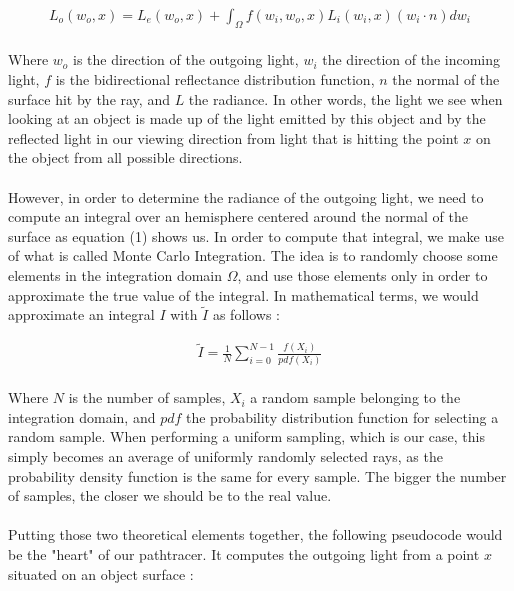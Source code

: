 \documentclass[12pt, oneside]{report}
\begin{document}
\begin{align}
	L_{o}(w_{o}, x) = L_{e}(w_{o}, x) + \int_{\Omega} f(w_{i}, w_{o}, x) L_{i}(w_{i}, x)(w_{i} \cdot n) dw_{i}
\end{align}

\paragraph{}Where $w_{o}$ is the direction of the outgoing light, $w_{i}$ the direction of the incoming light, $f$ is the bidirectional reflectance distribution function, $n$ the normal of the surface hit by the ray, and $L$ the radiance. In other words, the light we see when looking at an object is made up of the light emitted by this object and by the reflected light in our viewing direction from light that is hitting the point $x$ on the object from all possible directions.

\paragraph{}However, in order to determine the radiance of the outgoing light, we need to compute an integral over an hemisphere centered around the normal of the surface as equation (1) shows us. In order to compute that integral, we make use of what is called Monte Carlo Integration. The idea is to randomly choose some elements in the integration domain $\Omega$, and use those elements only in order to approximate the true value of the integral. In mathematical terms, we would approximate an integral $I$ with $\widetilde{I}$ as follows \cite{scratchapixel} :

\begin{align}
	\widetilde{I} = \frac{1}{N} \sum_{i=0}^{N-1} \frac{f(X_{i})}{pdf(X_{i})}
\end{align}

\paragraph{}Where $N$ is the number of samples, $X_{i}$ a random sample belonging to the integration domain, and $pdf$ the probability distribution function for selecting a random sample. When performing a uniform sampling, which is our case, this simply becomes an average of uniformly randomly selected rays, as the probability density function is the same for every sample. The bigger the number of samples, the closer we should be to the real value.

\paragraph{}Putting those two theoretical elements together, the following pseudocode would be the "heart" of our pathtracer. It computes the outgoing light from a point $x$ situated on an object surface :
\end{document}
